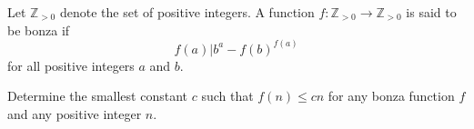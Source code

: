 Let $\mathbb{Z}_{>0}$ denote the set of positive integers. A function $f:\mathbb{Z}_{>0}\to\mathbb{Z}_{>0}$ is said to be bonza if
\[
f(a)\mathrel{\big|}b^a-f(b)^{f(a)}
\]
for all positive integers $a$ and $b$.

Determine the smallest constant $c$ such that $f(n)\leq cn$ for any bonza function $f$ and any positive integer $n$.
